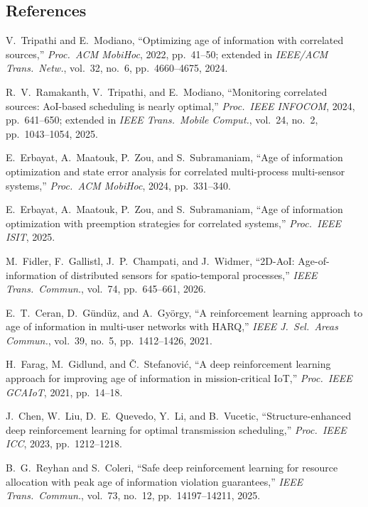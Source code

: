 \subsection{References}\label{sec:refs}
{\small
\begin{enumerate}[label={[\arabic*]},leftmargin=1cm,itemsep=0.15em]
  \item V.~Tripathi and E.~Modiano, ``Optimizing age of information with correlated sources,'' \emph{Proc.\ ACM MobiHoc}, 2022, pp.~41--50; extended in \emph{IEEE/ACM Trans.\ Netw.}, vol.~32, no.~6, pp.~4660--4675, 2024.
  \item R.~V.~Ramakanth, V.~Tripathi, and E.~Modiano, ``Monitoring correlated sources: AoI-based scheduling is nearly optimal,'' \emph{Proc.\ IEEE INFOCOM}, 2024, pp.~641--650; extended in \emph{IEEE Trans.\ Mobile Comput.}, vol.~24, no.~2, pp.~1043--1054, 2025.
  \item E.~Erbayat, A.~Maatouk, P.~Zou, and S.~Subramaniam, ``Age of information optimization and state error analysis for correlated multi-process multi-sensor systems,'' \emph{Proc.\ ACM MobiHoc}, 2024, pp.~331--340.
  \item E.~Erbayat, A.~Maatouk, P.~Zou, and S.~Subramaniam, ``Age of information optimization with preemption strategies for correlated systems,'' \emph{Proc.\ IEEE ISIT}, 2025.
  \item M.~Fidler, F.~Gallistl, J.~P.~Champati, and J.~Widmer, ``2D-AoI: Age-of-information of distributed sensors for spatio-temporal processes,'' \emph{IEEE Trans.\ Commun.}, vol.~74, pp.~645--661, 2026.
  \item E.~T.~Ceran, D.~G\"und\"uz, and A.~Gy\"orgy, ``A reinforcement learning approach to age of information in multi-user networks with HARQ,'' \emph{IEEE J.\ Sel.\ Areas Commun.}, vol.~39, no.~5, pp.~1412--1426, 2021.
  \item H.~Farag, M.~Gidlund, and \v{C}.~Stefanovi\'c, ``A deep reinforcement learning approach for improving age of information in mission-critical IoT,'' \emph{Proc.\ IEEE GCAIoT}, 2021, pp.~14--18.
  \item J.~Chen, W.~Liu, D.~E.~Quevedo, Y.~Li, and B.~Vucetic, ``Structure-enhanced deep reinforcement learning for optimal transmission scheduling,'' \emph{Proc.\ IEEE ICC}, 2023, pp.~1212--1218.
  \item B.~G.~Reyhan and S.~Coleri, ``Safe deep reinforcement learning for resource allocation with peak age of information violation guarantees,'' \emph{IEEE Trans.\ Commun.}, vol.~73, no.~12, pp.~14197--14211, 2025.

\end{enumerate}}
